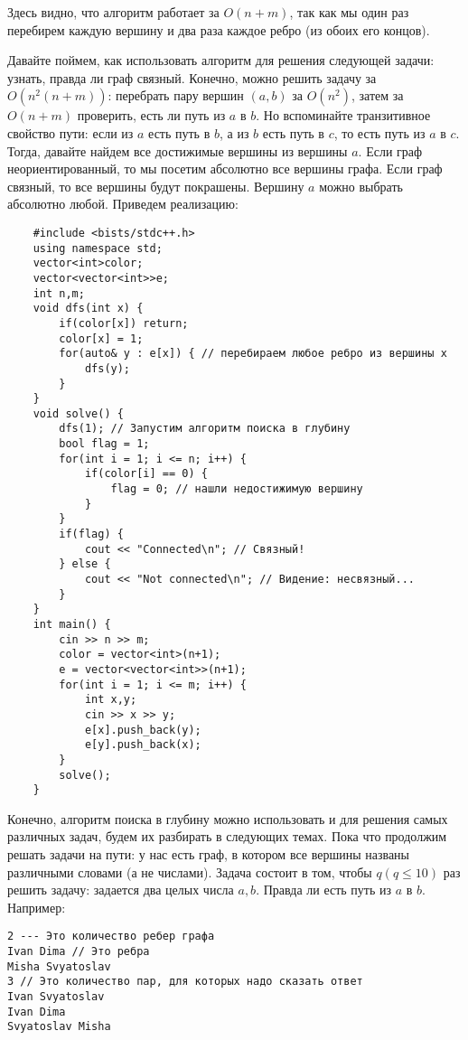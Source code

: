 \documentclass{article}
\begin{document}
Здесь видно, что алгоритм работает за $O(n + m)$, так как мы один раз перебирем каждую вершину и два раза каждое ребро (из обоих его концов). 

Давайте поймем, как использовать алгоритм для решения следующей задачи: узнать, правда ли граф связный. Конечно, можно решить задачу за $O(n^2 (n+m))$: перебрать пару вершин $(a,b)$ за $O(n^2)$, затем за $O(n+m)$ проверить, есть ли путь из $a$ в $b$. Но вспоминайте транзитивное свойство пути: если из $a$ есть путь в $b$, а из $b$ есть путь в $c$, то есть путь из $a$ в $c$. Тогда, давайте найдем все достижимые вершины из вершины $a$. Если граф неориентированный, то мы посетим абсолютно все вершины графа. Если граф связный, то все вершины будут покрашены. Вершину $a$ можно выбрать абсолютно любой. Приведем реализацию: 

\begin{verbatim}
    #include <bists/stdc++.h>
    using namespace std;
    vector<int>color; 
    vector<vector<int>>e;
    int n,m;
    void dfs(int x) {
        if(color[x]) return;
        color[x] = 1;
        for(auto& y : e[x]) { // перебираем любое ребро из вершины x
            dfs(y);
        }
    }
    void solve() {
        dfs(1); // Запустим алгоритм поиска в глубину
        bool flag = 1;
        for(int i = 1; i <= n; i++) {
            if(color[i] == 0) {
                flag = 0; // нашли недостижимую вершину
            }
        }
        if(flag) {
            cout << "Connected\n"; // Связный!
        } else {
            cout << "Not connected\n"; // Видение: несвязный...
        }
    }
    int main() {
        cin >> n >> m;
        color = vector<int>(n+1);
        e = vector<vector<int>>(n+1);
        for(int i = 1; i <= m; i++) {
            int x,y;
            cin >> x >> y;
            e[x].push_back(y);
            e[y].push_back(x);
        }
        solve();
    }
\end{verbatim}

Конечно, алгоритм поиска в глубину можно использовать и для решения самых различных задач, будем их разбирать в следующих темах. Пока что продолжим решать задачи на пути: у нас есть граф, в котором все вершины названы различными словами (а не числами). Задача состоит в том, чтобы $q (q \leq 10)$ раз решить задачу: задается два целых числа $a,b$. Правда ли есть путь из $a$ в $b$. 
Например:

\begin{verbatim}
2 --- Это количество ребер графа
Ivan Dima // Это ребра
Misha Svyatoslav
3 // Это количество пар, для которых надо сказать ответ
Ivan Svyatoslav
Ivan Dima
Svyatoslav Misha
\end{verbatim}
\end{document}
